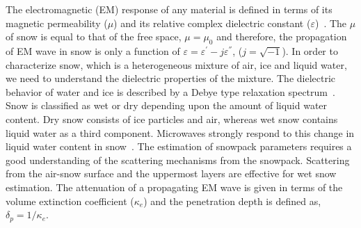 The electromagnetic (EM) response of any material is defined in terms of its magnetic permeability ($\mu$) and its relative complex dielectric constant ($\varepsilon$)~\citep{von1954dielectric}. The $\mu$ of snow is equal to that of the free space, $\mu=\mu_0$ and therefore, the propagation of EM wave in snow is only a function of $\varepsilon=\varepsilon^{'}-j\varepsilon^{''}$, ($j=\sqrt{-1}$). In order to characterize snow, which is a heterogeneous mixture of air, ice and liquid water, we need to understand the dielectric properties of the mixture. The dielectric behavior of water and ice is described by a Debye type relaxation spectrum~\citep{stiles1980dielectric}. Snow is classified as wet or dry depending upon the amount of liquid water content. Dry snow consists of ice particles and air, whereas wet snow contains liquid water as a third component. Microwaves strongly respond to this change in liquid water content in snow~\citep{hallikainen1986dielectric,tiuri1984complex,Hallikainen87}. The estimation of snowpack parameters requires a good understanding of the scattering mechanisms from the snowpack. Scattering from the air-snow surface and the uppermost layers are effective for wet snow estimation. The attenuation of a propagating EM wave is given in terms of the volume extinction coefficient ($\kappa_e$) and the penetration depth is defined as, $\delta_{p}=1/\kappa_e$. 


